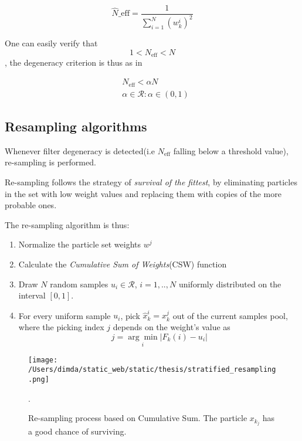 \begin{equation}
\hat{N}\_{\text{eff}} = \frac{1}{\sum_{i=1}^{N}(w_k^i)^2}
\end{equation}


One can easily verify that $$1 < N_{\text{eff}} < N$$ , the degeneracy criterion is thus as in 

\begin{equation}\label{eq:criterion_degeneracy}
\begin{aligned}
&N_{\text{eff}} < \alpha N \\&\alpha \in \mathcal{R}: \alpha \in (0,1)
\end{aligned}
\end{equation}

\subsection{Resampling algorithms}


Whenever filter degeneracy is detected(i.e $N_{\text{eff}}$ falling below a threshold value), re-sampling is performed.


Re-sampling follows the strategy of \emph{survival of the fittest}, by eliminating particles in the set with low weight values and replacing them with copies of the more probable ones.


The re-sampling algorithm is thus\cite{Ristic2004}:

\begin{enumerate}
	\item Normalize the particle set weights $w^j$
	\item Calculate the \emph{Cumulative Sum of Weights}(CSW) function
	\item Draw $N$ random samples $u_i \in \mathcal{R}$, $i=1,..,N$ uniformly distributed on the interval $[0,1]$.
	\item For every uniform sample $u_i$, pick $\hat{x}_k^i = x_k^j$ out of the current samples pool, where the picking index $j$ depends on the weight's value as \[ j = \underset{i}{\arg\min} |{F_k(i)-u_i}| \]

\end{enumerate}

\begin{figure}[H]
	\centering
	\texttt{[image: /Users/dimda/static\_web/static/thesis/stratified\_resampling.png]}
	\caption{Re-sampling process based on Cumulative Sum. The particle $x_{k_j}$ has a good chance of surviving.}.
	\label{fig:CSW}
\end{figure}



